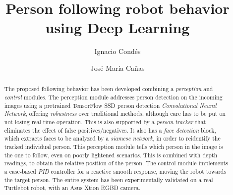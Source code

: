 \documentclass[11pt, a4paper]{svproc}
\title{Person following robot behavior using Deep Learning}
\author{Ignacio Condés\inst{1} \and José María Cañas\inst{2}}
\institute{Universidad Rey Juan Carlos,
	\email{ignacio.condes.m@gmail.com},
	\and
Universidad Rey Juan Carlos, \email{jmplaza@gsyc.es}}
\begin{document}
	\maketitle
	
	\begin{abstract}
		The proposed following behavior has been developed combining a \emph{perception} and \emph{control} modules. The perception module addresses person detection on the incoming images using a pretrained TensorFlow SSD person detection \emph{Convolutional Neural Network}, offering \emph{robustness} over traditional methods, although care has to be put on not losing real-time operation. This is also supported by a \emph{person tracker} that eliminates the effect of false positives/negatives. It also has a \emph{face detection} block, which extracts faces to be analyzed by a \emph{siamese network}, in order to reidentify the tracked individual person. This perception module tells which person in the image is the one to follow, even on poorly lightened scenarios. This is combined with depth readings, to obtain the relative position of the person. The control module implements a case-based \emph{PID} controller for a reactive smooth response, moving the robot towards the target person. The entire system has been experimentally validated on a real Turtlebot robot, with an Asus Xtion RGBD camera.
	\end{abstract}

	
	
\end{document}
